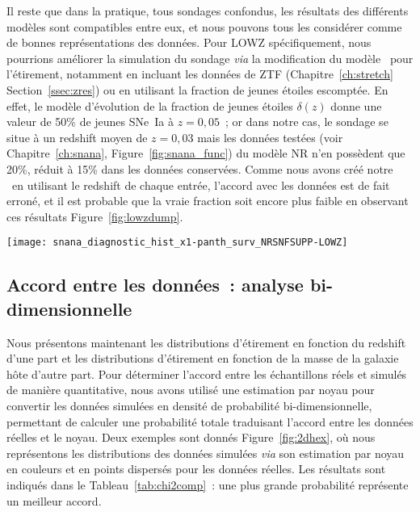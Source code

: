 \documentclass[../main/main.tex]{subfiles}
\begin{document}
Il reste que dans la pratique, tous sondages confondus, les résultats des
différents modèles sont compatibles entre eux, et nous pouvons tous les
considérer comme de bonnes représentations des données. Pour LOWZ
spécifiquement, nous pourrions améliorer la simulation du sondage \textit{via}
la modification du modèle~ pour l'étirement, notamment
en incluant les données de ZTF (Chapitre~\ref{ch:stretch}
Section~\ref{ssec:zres}) ou en utilisant la fraction de jeunes étoiles
escomptée. En effet, le modèle d'évolution de la fraction de jeunes étoiles
$\delta(z)$ donne une valeur de 50\% de jeunes SNe~Ia à $z = 0,05$~; or dans
notre cas, le sondage se situe à un redshift moyen de $z = 0,03$ mais les
données testées (voir Chapitre~\ref{ch:snana}, Figure~\ref{fig:snana_func}) du
modèle NR n'en possèdent que 20\%, réduit à 15\% dans les données conservées.
Comme nous avons créé notre \hostlib\ en utilisant le redshift de chaque entrée,
l'accord avec les données est de fait erroné, et il est probable que la vraie
fraction soit encore plus faible en observant ces résultats
Figure~\ref{fig:lowzdump}.

\begin{SCfigure}[1][ht]
    \centering
    \texttt{[image: snana\_diagnostic\_hist\_x1-panth\_surv\_NRSNFSUPP-LOWZ]}
    \caption[Histogrammes des données testées et conservées du modèle NR pour le
    sondage LOWZ]{Histogrammes des étirements des données de LOWZ~:\textit{en
        rouge} celles de Pantheon~; \textit{en violet} les données testées et
        \textit{en orange} les données conservées pour le modèle NR. Le
        modèle~ évalué aux fractions des jeunes SNe~Ia
        pour ces deux échantillons sont tracés en marqueurs de la couleur
        correspondante~; le modèle évalué au redshift moyen de la distribution
        est tracé en marqueurs noirs. Les parties vieilles des données testées
    et conservées sont en pointillés.}
    \label{fig:lowzdump}
\end{SCfigure}

\subsection{Accord entre les données~: analyse
bi-dimensionnelle}\label{ssec:comp2d}

Nous présentons maintenant les distributions d'étirement en fonction du redshift
d'une part et les distributions d'étirement en fonction de la masse de la
galaxie hôte d'autre part. Pour déterminer l'accord entre les échantillons réels
et simulés de manière quantitative, nous avons utilisé une estimation par noyau
pour convertir les données simulées en densité de probabilité bi-dimensionnelle,
permettant de calculer une probabilité totale traduisant l'accord entre les
données réelles et le noyau. Deux exemples sont donnés Figure~\ref{fig:2dhex},
où nous représentons les distributions des données simulées \textit{via} son
estimation par noyau en couleurs et en points dispersés pour les données
réelles. Les résultats sont indiqués dans le Tableau~\ref{tab:chi2comp}~: une
plus grande probabilité représente un meilleur accord.
\end{document}
